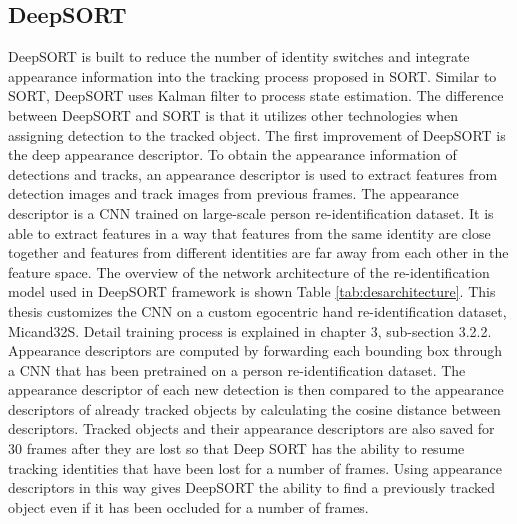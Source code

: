 \subsection{DeepSORT}
DeepSORT is built to reduce the number of identity switches and integrate appearance information into the tracking process proposed in SORT. Similar to SORT, DeepSORT uses Kalman filter to process state estimation. The difference between DeepSORT and SORT is that it utilizes other technologies when assigning detection to the tracked object.
The first improvement of DeepSORT is the deep appearance descriptor.  To obtain the appearance information of detections and tracks, an appearance descriptor is used to extract features from detection images and track images from previous frames. The appearance descriptor is a CNN trained on large-scale person re-identification dataset. It is able to extract features in a way that features from the same identity are close together and features from different identities are far away from each other in the feature space. The overview of the network architecture of the re-identification model used in DeepSORT framework is shown Table \ref{tab:desarchitecture}.
This thesis customizes the CNN on a custom egocentric hand re-identification dataset, Micand32S. Detail training process is explained in chapter 3, sub-section 3.2.2. Appearance descriptors are computed by forwarding each bounding box through a CNN that has been pretrained on a person re-identification dataset. The appearance descriptor of each new detection is then compared to the appearance descriptors of already tracked objects by calculating the cosine distance between descriptors. Tracked objects and their appearance descriptors are also saved for 30 frames after they are lost so that Deep SORT has the ability to resume tracking identities that have been lost for a number of frames. Using appearance descriptors in this way gives DeepSORT the ability to find a previously tracked object even if it has been occluded for a number of frames.
